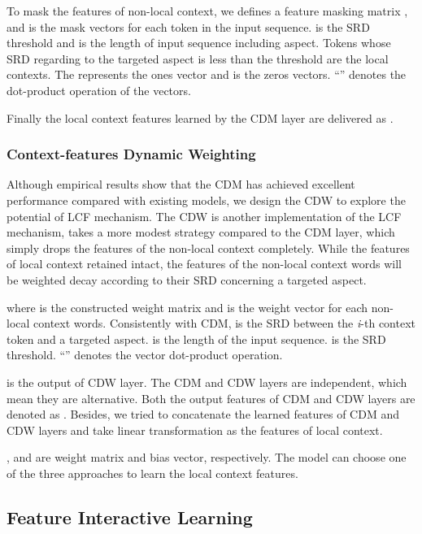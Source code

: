\documentclass[a4paper,fleqn]{cas-sc}
\begin{document}
To mask the features of non-local context, we defines a feature masking matrix , and  is the mask vectors for each token in the input sequence.  is the SRD threshold and  is the length of input sequence including aspect. Tokens whose SRD regarding to the targeted aspect is less than the threshold  are the local contexts. The  represents the ones vector and  is the zeros vectors. ``'' denotes the dot-product operation of the vectors.


Finally the local context features learned by the CDM layer are delivered as .

\subsubsection{Context-features Dynamic Weighting}

Although empirical results show that the CDM has achieved excellent performance compared with existing models, we design the CDW to explore the potential of LCF mechanism. The CDW is another implementation of the LCF mechanism, takes a more modest strategy compared to the CDM layer, which simply drops the features of the non-local context completely. 
While the features of local context retained intact, the features of the non-local context words will be weighted decay according to their SRD concerning a targeted aspect.






where  is the constructed weight matrix and  is the weight vector for each non-local context words. Consistently with CDM,  is the SRD between the \textit{i}-th context token and a targeted aspect.  is the length of the input sequence.  is the SRD threshold. ``'' denotes the vector dot-product operation.

 is the output of CDW layer. The CDM and CDW layers are independent, which mean they are alternative. Both the output features of CDM and CDW layers are denoted as . Besides, we tried to concatenate the learned features of CDM and CDW layers and take linear transformation as the features of local context.




,  and  are weight matrix and bias vector, respectively. The model can choose one of the three approaches to learn the local context features.
\subsection{Feature Interactive Learning}
\end{document}
